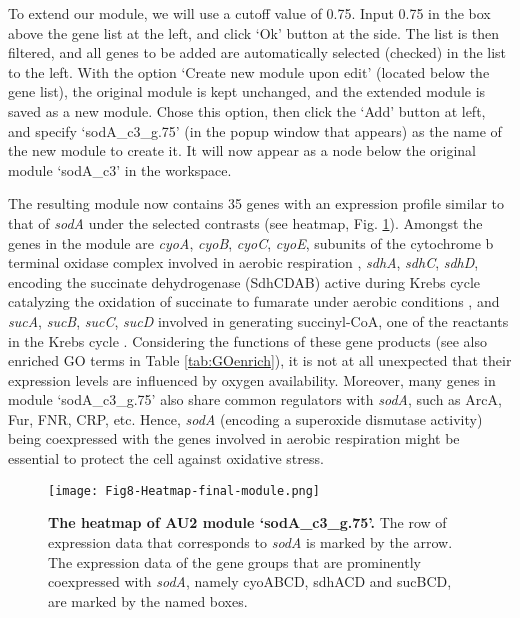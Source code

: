 \begin{adjustwidth}{5mm}{0cm}
To extend our module, we will use a cutoff value of 0.75. Input 0.75 in the box 
above the gene list at the left, and click `Ok' button at the side. The list is 
then filtered, and all genes to be added are automatically selected (checked) 
in the list to the left. With the option `Create new module upon edit' (located 
below the gene list), the original module is kept unchanged, and the extended 
module is saved as a new module. Chose this option, then click the `Add' button 
at left, and specify `sodA\_c3\_g.75' (in the popup window that appears) as the 
name of the new module to create it. It will now appear as a node below the 
original module `sodA\_c3' in the workspace. 
\end{adjustwidth}

The resulting module now contains 35 genes with an expression profile similar 
to that of \textit{sodA} under the selected contrasts (see heatmap, Fig. 
\ref{fig:colombos-heatmap-final}). 
Amongst the genes in the module are \textit{cyoA}, \textit{cyoB}, 
\textit{cyoC}, \textit{cyoE}, subunits of the cytochrome b terminal oxidase 
complex involved in aerobic respiration \cite{Cotter1992}, \textit{sdhA}, 
\textit{sdhC}, \textit{sdhD}, encoding the succinate dehydrogenase (SdhCDAB) 
active during Krebs cycle catalyzing the oxidation of succinate to fumarate 
under aerobic conditions \cite{Wilde1986}, and \textit{sucA}, \textit{sucB}, 
\textit{sucC}, \textit{sucD} involved in generating succinyl-CoA, one of the 
reactants in the Krebs cycle \cite{Buck1989}. 
Considering the functions of these gene products (see also enriched GO terms in 
Table \ref{tab:GOenrich}), it is not at all unexpected that their expression 
levels are influenced by oxygen availability. 
Moreover, many genes in module `sodA\_c3\_g.75' also share common regulators 
with \textit{sodA}, such as ArcA, Fur, FNR, CRP, etc. Hence, \textit{sodA} 
(encoding a superoxide dismutase activity) being coexpressed with the genes 
involved in aerobic respiration might be essential to protect the cell against 
oxidative stress.

\begin{figure}[tb]
	\centering
  	\texttt{[image: Fig8-Heatmap-final-module.png]}
	\caption[COLOMBOS heatmap of module `sodA\_c3\_g.75']{
	\textbf{The heatmap of AU2 module `sodA\_c3\_g.75'.}
	The row of expression data that corresponds to \textit{sodA} is
	marked by the arrow. The expression data of the gene groups that are 
	prominently coexpressed with \textit{sodA}, namely cyoABCD, sdhACD and 
	sucBCD, are marked by the named boxes.}
	\label{fig:colombos-heatmap-final}
\end{figure}


